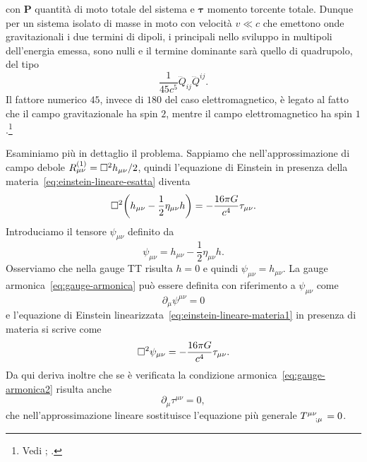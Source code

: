 con $\bm{P}$ quantità di moto totale del sistema e $\bm{\tau}$ momento torcente
totale.  Dunque per un sistema isolato di masse in moto con velocità $v \ll c$
che emettono onde gravitazionali i due termini di dipoli, i principali nello
sviluppo in multipoli dell'energia emessa, sono nulli e il termine dominante
sarà quello di quadrupolo, del tipo
\begin{equation}
  \frac{1}{45c^{5}}\dddot{Q}_{ij}\dddot{Q}^{ij}.
\end{equation}
Il fattore numerico $45$, invece di $180$ del caso elettromagnetico, è legato al
fatto che il campo gravitazionale ha spin $2$, mentre il campo elettromagnetico
ha spin
$1$.\footnote{Vedi \textcite[974]{misner:gravitation};
  \textcite[471]{shapiro:black-holes}.}

Esaminiamo più in dettaglio il problema.  Sappiamo che nell'approssimazione di
campo debole $R_{\mu\nu}^{(1)} = \Box^{2} h_{\mu\nu}/2$, quindi l'equazione di
Einstein in presenza della materia~\eqref{eq:einstein-lineare-esatta} diventa
\begin{equation}
  \label{eq:einstein-lineare-materia1}
  \Box^{2} \bigg(h_{\mu\nu} - \frac{1}{2} \eta_{\mu\nu}h \bigg) = -\frac{16\pi
    G}{c^{4}} \tau_{\mu\nu}.
\end{equation}
Introduciamo il tensore $\psi_{\mu\nu}$ definito da
\begin{equation}
  \psi_{\mu\nu} = h_{\mu\nu} - \frac{1}{2} \eta_{\mu\nu} h.
\end{equation}
Osserviamo che nella gauge TT risulta $h = 0$ e quindi
$\psi_{\mu\nu} = h_{\mu\nu}$.  La gauge armonica~\eqref{eq:gauge-armonica} può
essere definita con riferimento a $\psi_{\mu\nu}$ come
\begin{equation}
  \label{eq:gauge-armonica2}
  \partial_{\mu}\psi^{\mu\nu} = 0
\end{equation}
e l'equazione di Einstein linearizzata~\eqref{eq:einstein-lineare-materia1} in
presenza di materia si scrive come
\begin{equation}
  \label{eq:einstein-lineare-materia2}
  \Box^{2} \psi_{\mu\nu} = -\frac{16\pi G}{c^{4}} \tau_{\mu\nu}.
\end{equation}
Da qui deriva inoltre che se è verificata la condizione
armonica~\eqref{eq:gauge-armonica2} risulta anche
\begin{equation}
  \label{eq:gauge-armonica-tau}
  \partial_{\mu}\tau^{\mu\nu} = 0,
\end{equation}
che nell'approssimazione lineare sostituisce l'equazione più generale
$\tensor{T}{^{\mu\nu}_{;\mu}} = 0$.

